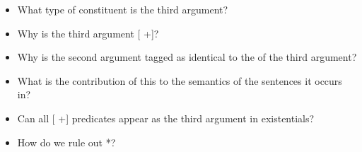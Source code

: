 \documentclass[a4paper,landscape,headrule,footrule]{foils}
\begin{document}

\begin{itemize}
\item What type of constituent is the third argument?
\item Why is the third argument [ +]?
\item Why is the second argument tagged as identical to the 
  of the third argument?
\end{itemize}

\begin{center}
  \begin{tiny}
  \end{tiny}
\end{center}


\begin{itemize}
\item What is the contribution of this  to the semantics of the sentences 
it occurs in?
\item Can all [ +] predicates appear as the third argument in 
existentials?
\item How do we rule out *?  
\end{itemize}

\begin{center}
  \begin{tiny}
  \end{tiny}
\end{center}
\end{document}
